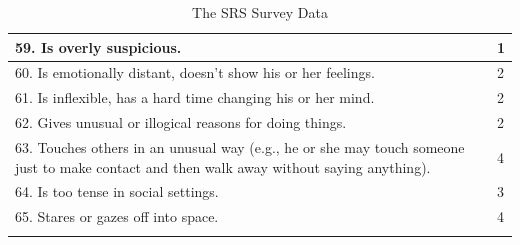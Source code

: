 \documentclass{ut-thesis}
\begin{document}
\begin{appendices}
\begin{longtable}{ | p{13cm} | l | }
	59. Is overly suspicious.	&	1	\\	\hline
	60. Is emotionally distant, doesn't show his or her feelings.	&	2	\\	\hline
	61. Is inflexible, has a hard time changing his or her mind.	&	2	\\	\hline
	62. Gives unusual or illogical reasons for doing things.	&	2	\\	\hline
	63. Touches others in an unusual way (e.g., he or she may touch someone just to make contact and then walk away without saying anything).	&	4	\\	\hline
	64. Is too tense in social settings.	&	3	\\	\hline
	65. Stares or gazes off into space.	&	4	\\	\hline
\caption{The SRS Survey Data}
\label{tab:SRSSurveyData}
\end{longtable}


\end{appendices}
\end{document}
